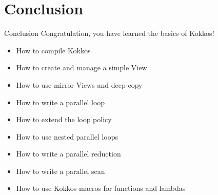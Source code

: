 \documentclass[
    aspectratio=169,
    \createHandout
]{beamer}
\begin{document}

\section[Conclusion]{Conclusion}


\begin{frame}{Conclusion}
    Congratulation, you have learned the basics of Kokkos!

    \begin{itemize}
        \item How to compile Kokkos
        \item How to create and manage a simple View
        \item How to use mirror Views and deep copy
        \item How to write a parallel loop
        \item How to extend the loop policy
        \item How to use nested parallel loops
        \item How to write a parallel reduction
        \item How to write a parallel scan
        \item How to use Kokkos macros for functions and lambdas
    \end{itemize}
\end{frame}
\end{document}
